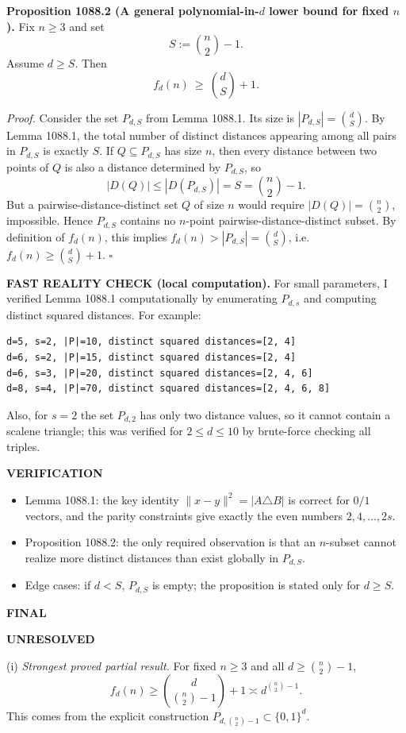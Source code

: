 \textbf{Proposition 1088.2 (A general polynomial-in-$d$ lower bound for fixed $n$).}
Fix $n\ge 3$ and set
\[S:=\binom{n}{2}-1.
\]
Assume $d\ge S$. Then
\[f_d(n)\ \ge\ \binom{d}{S}+1.
\]

\emph{Proof.}
Consider the set $P_{d,S}$ from Lemma 1088.1. Its size is $|P_{d,S}|=\binom{d}{S}$.
By Lemma 1088.1, the total number of distinct distances appearing among all pairs in $P_{d,S}$ is exactly $S$.
If $Q\subseteq P_{d,S}$ has size $n$, then every distance between two points of $Q$ is also a distance determined by $P_{d,S}$, so
\[|D(Q)|\le |D(P_{d,S})| = S = \binom{n}{2}-1.
\]
But a pairwise-distance-distinct set $Q$ of size $n$ would require $|D(Q)|=\binom{n}{2}$, impossible. Hence $P_{d,S}$ contains no $n$-point pairwise-distance-distinct subset.
By definition of $f_d(n)$, this implies $f_d(n)>|P_{d,S}|=\binom{d}{S}$, i.e. $f_d(n)\ge \binom{d}{S}+1$.
\hfill$\square$

\textbf{FAST REALITY CHECK (local computation).}
For small parameters, I verified Lemma 1088.1 computationally by enumerating $P_{d,s}$ and computing distinct squared distances.
For example:
\begin{verbatim}
d=5, s=2, |P|=10, distinct squared distances=[2, 4]
d=6, s=2, |P|=15, distinct squared distances=[2, 4]
d=6, s=3, |P|=20, distinct squared distances=[2, 4, 6]
d=8, s=4, |P|=70, distinct squared distances=[2, 4, 6, 8]
\end{verbatim}
Also, for $s=2$ the set $P_{d,2}$ has only two distance values, so it cannot contain a scalene triangle; this was verified for $2\le d\le 10$ by brute-force checking all triples.

\textbf{VERIFICATION}

\begin{itemize}
\item Lemma 1088.1: the key identity $\|x-y\|^2=|A\triangle B|$ is correct for $0/1$ vectors, and the parity constraints give exactly the even numbers $2,4,\dots,2s$.
\item Proposition 1088.2: the only required observation is that an $n$-subset cannot realize more distinct distances than exist globally in $P_{d,S}$.
\item Edge cases: if $d<S$, $P_{d,S}$ is empty; the proposition is stated only for $d\ge S$.
\end{itemize}

\textbf{FINAL}

\textbf{UNRESOLVED}

(i) \emph{Strongest proved partial result.} For fixed $n\ge 3$ and all $d\ge \binom{n}{2}-1$,
\[f_d(n)\ge \binom{d}{\binom{n}{2}-1}+1\asymp d^{\binom{n}{2}-1}.
\]
This comes from the explicit construction $P_{d,\binom{n}{2}-1}\subset\{0,1\}^d$.

